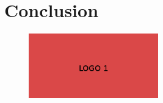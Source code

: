 \chapter{Conclusion}

\vfill

\begin{figure}[!h]
  \centering
    \includegraphics[width=0.5\textwidth]{logo1.jpg}
\end{figure}

\vfill